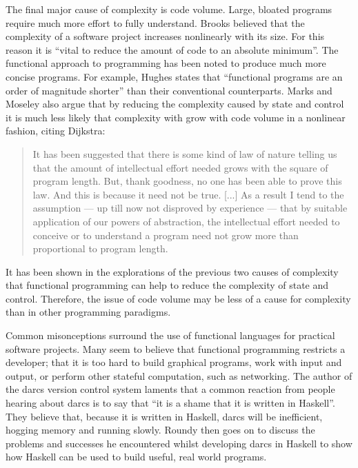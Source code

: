 The final major cause of complexity is code volume. Large, bloated programs
require much more effort to fully understand. Brooks believed that the complexity
of a software project increases nonlinearly with its size.\cite{brooks1987bullet}
For this reason it is ``vital to reduce the amount of code to an absolute
minimum''.\cite{moseley2006tarpit} The functional approach to programming
has been noted to produce much more concise programs. For example, Hughes
states that ``functional programs are an order of magnitude shorter'' than
their conventional counterparts.\cite{hughes1989whyfp} Marks and Moseley
also argue that by reducing the complexity caused by state and control it
is much less likely that complexity with grow with code volume in a nonlinear
fashion, citing Dijkstra\cite{dijkstra1972humble}:

\begin{quote}
It has been suggested that there is some kind of law of nature telling us that
the amount of intellectual effort needed grows with the square of program length.
But, thank goodness, no one has been able to prove this law. And this is because
it need not be true. [...] As a result I tend to the assumption --- up till now
not disproved by experience --- that by suitable application of our powers of
abstraction, the intellectual effort needed to conceive or to understand a program
need not grow more than proportional to program length.
\end{quote}

It has been shown in the explorations of the previous two causes of complexity
that functional programming can help to reduce the complexity of state and
control. Therefore, the issue of code volume may be less of a cause for complexity
than in other programming paradigms.

Common misonceptions surround the use of functional languages for practical
software projects. Many seem to believe that functional programming restricts
a developer; that it is too hard to build graphical programs, work with input
and output, or perform other stateful computation, such as networking.
The author of the darcs version control system laments that a common reaction
from people hearing about darcs is to say that ``it is a shame that it is
written in Haskell''.\cite{roundy2005darcs} They believe that, because it is
written in Haskell, darcs will be inefficient, hogging memory and running slowly.
Roundy then goes on to discuss the problems and successes he encountered whilst
developing darcs in Haskell to show how Haskell can be used to build useful, real
world programs.


